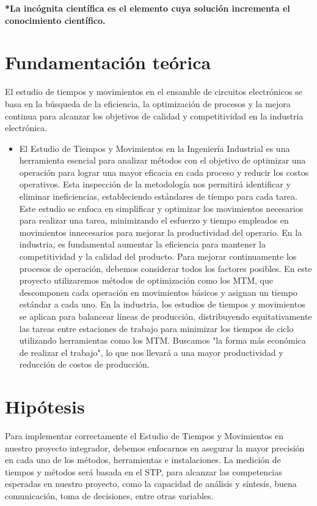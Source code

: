     \textbf{*La incógnita científica es el elemento cuya solución incrementa el conocimiento científico.}
    \section{Fundamentación teórica}
    
    El estudio de tiempos y movimientos en el ensamble de circuitos electrónicos se basa en la búsqueda de la eficiencia, la optimización de procesos y la mejora continua para alcanzar los objetivos de calidad y competitividad en la industria electrónica.
    \begin{itemize}
        \item El Estudio de Tiempos y Movimientos en la Ingeniería Industrial es una herramienta esencial para analizar métodos con el objetivo de optimizar una operación para lograr una mayor eficacia en cada proceso y reducir los costos operativos. Esta inspección de la metodología nos permitirá identificar y eliminar ineficiencias, estableciendo estándares de tiempo para cada tarea. Este estudio se enfoca en simplificar y optimizar los movimientos necesarios para realizar una tarea, minimizando el esfuerzo y tiempo empleados en movimientos innecesarios para mejorar la productividad del operario. En la industria, es fundamental aumentar la eficiencia para mantener la competitividad y la calidad del producto. Para mejorar continuamente los procesos de operación, debemos considerar todos los factores posibles. En este proyecto utilizaremos métodos de optimización como los MTM, que descomponen cada operación en movimientos básicos y asignan un tiempo estándar a cada uno. En la industria, los estudios de tiempos y movimientos se aplican para balancear líneas de producción, distribuyendo equitativamente las tareas entre estaciones de trabajo para minimizar los tiempos de ciclo utilizando herramientas como los MTM. Buscamos "la forma más económica de realizar el trabajo", lo que nos llevará a una mayor productividad y reducción de costos de producción.
    
    \end{itemize}
    \section{Hipótesis}
    
    Para implementar correctamente el Estudio de Tiempos y Movimientos en nuestro proyecto integrador, debemos enfocarnos en asegurar la mayor precisión en cada uno de los métodos, herramientas e instalaciones. La medición de tiempos y métodos será basada en el STP, para alcanzar las competencias esperadas en nuestro proyecto, como la capacidad de análisis y síntesis, buena comunicación, toma de decisiones, entre otras variables.
    
